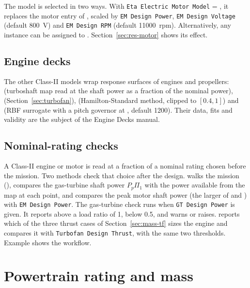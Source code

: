 \documentclass[a4paper,11pt]{article}
\begin{document}
The model is selected in two ways. With \texttt{Eta Electric Motor Model} = , it
replaces the motor entry of , scaled by \texttt{EM Design Power},
\texttt{EM Design Voltage} (default \SI{800}{V}) and \texttt{EM Design RPM} (default
\SI{11000}{rpm}). Alternatively, any instance can be assigned to .
Section~\ref{sec:res-motor} shows its effect.

\subsection{Engine decks}
The other Class-II models wrap response surfaces of engines and propellers:
 (turboshaft map read at the shaft power as a fraction of
the nominal power),  (Section~\ref{sec:turbofan}),
 (Hamilton-Standard method, clipped to $[0.4, 1]$) and
 (RBF surrogate with a pitch governor at , default 1200). Their data, fits and validity are the subject of the Engine Decks
manual.

\subsection{Nominal-rating checks}\label{sec:checks}
A Class-II engine or motor is read at a fraction of a nominal rating chosen before the
mission. Two methods check that choice after the design.
 walks the mission
(), compares the gas-turbine shaft power $P_p\Pi_1$ with the
power available from the map at each point, and compares the peak motor shaft power
(the larger of  and ) with \texttt{EM Design Power}. The gas-turbine
check runs when \texttt{GT Design Power} is given. It reports  above a load ratio of 1,
 below 0.5, and warns or raises. 
reports which of the three thrust cases of Section~\ref{sec:mass-tf} sizes the engine and
compares it with \texttt{Turbofan Design Thrust}, with the same two thresholds. Example
 shows the workflow.

\section{Powertrain rating and mass}\label{sec:mass}
\end{document}
